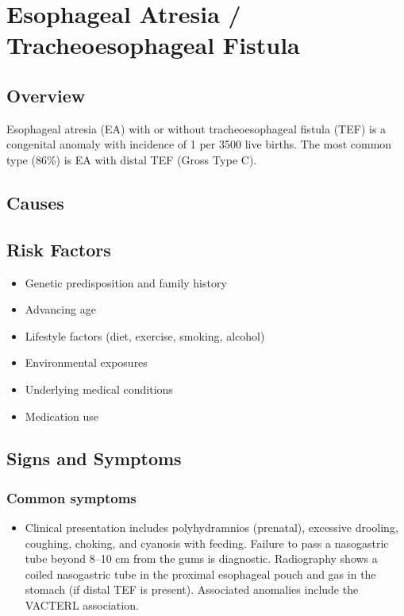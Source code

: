 \chapter{Esophageal Atresia / Tracheoesophageal Fistula}
\label{sec:Esophageal Atresia}

\section{Overview}
Esophageal atresia (EA) with or without tracheoesophageal fistula (TEF) is a congenital anomaly with incidence of 1 per 3500 live births. The most common type (86\%) is EA with distal TEF (Gross Type C).
\section{Causes}
\section{Risk Factors}

\begin{itemize}[noitemsep]
  \item Genetic predisposition and family history
  \item Advancing age
  \item Lifestyle factors (diet, exercise, smoking, alcohol)
  \item Environmental exposures
  \item Underlying medical conditions
  \item Medication use
\end{itemize}
\section{Signs and Symptoms}

\subsection{Common symptoms}
\begin{itemize}[noitemsep]
  \item Clinical presentation includes polyhydramnios (prenatal), excessive drooling, coughing, choking, and cyanosis with feeding. Failure to pass a nasogastric tube beyond 8--10 cm from the gums is diagnostic. Radiography shows a coiled nasogastric tube in the proximal esophageal pouch and gas in the stomach (if distal TEF is present). Associated anomalies include the VACTERL association. 
  \end{itemize}

